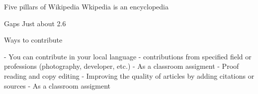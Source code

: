 Five pillars of Wikipedia
Wkipedia is an encyclopedia


Gaps 
Just about 2.6%


Ways to contribute

- You can contribute in your local language
- contributions from specified field or professions (photography, developer, etc.)
- As a classroom assigment
- Proof reading and copy editing
- Improving the quality of articles by adding citations or sources
- As a classroom assigment
